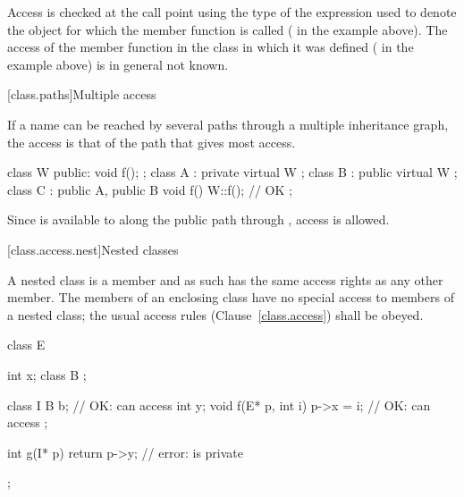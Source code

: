 \pnum
Access is checked at the call point using the type of the expression used
to denote the object for which the member function is called
(
in the example above).
The access of the member function in the class in which it was defined
(
in the example above) is in general not known.

[class.paths]{Multiple access}%

\pnum
If a name can be reached by several paths through a multiple inheritance
graph, the access is that of the path that gives most access.
\enterexample

\begin{codeblock}
class W { public: void f(); };
class A : private virtual W { };
class B : public virtual W { };
class C : public A, public B {
  void f() { W::f(); }          // OK
};
\end{codeblock}

\pnum
Since
is available to
along the public path through
,
access is allowed.
\exitexample

[class.access.nest]{Nested classes}%
%

\pnum
A nested class is a member and as such has the same access rights as any other member.
The members of an enclosing class have no special access to members of a nested
class; the usual access rules (Clause~\ref{class.access}) shall be obeyed.
\enterexample
{}%

\begin{codeblock}
class E {
  int x;
  class B { };

  class I {
    B b;                        // OK:  can access 
    int y;
    void f(E* p, int i) {
      p->x = i;                 // OK:  can access 
    }
  };

  int g(I* p) {
    return p->y;                // error:  is private
  }
};
\end{codeblock}
\exitexample%

